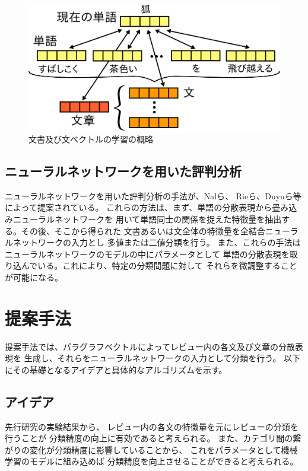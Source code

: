 \documentclass{ttithesis}
\begin{document}
\begin{figure}
  \includegraphics{fig/dvsvwv.png}
  \caption{文書及び文ベクトルの学習の概略}
  \label{fig:ParagraphVector}
\end{figure}


\subsection{ニューラルネットワークを用いた評判分析}

 ニューラルネットワークを用いた評判分析の手法が、Nalら\cite{nal14}、
Rieら\cite{rie14}、Duyuら\cite{duyu15}等によって提案されている。
 これらの方法は、まず、単語の分散表現から畳み込みニューラルネットワークを
用いて単語同士の関係を捉えた特徴量を抽出する。その後、そこから得られた
文書あるいは文全体の特徴量を全結合ニューラルネットワークの入力とし
多値または二値分類を行う。
また、これらの手法はニューラルネットワークのモデルの中にパラメータとして
単語の分散表現を取り込んでいる。これにより、特定の分類問題に対して
それらを微調整することが可能になる。



\section{提案手法}

提案手法では、パラグラフベクトルによってレビュー内の各文及び文章の分散表現を
生成し、それらをニューラルネットワークの入力として分類を行う。
以下にその基礎となるアイデアと具体的なアルゴリズムを示す。


\subsection{アイデア}

先行研究\cite{fujitani15}の実験結果から、
レビュー内の各文の特徴量を元にレビューの分類を行うことが
分類精度の向上に有効であると考えられる。
また、カテゴリ間の繋がりの変化が分類精度に影響していることから、
これをパラメータとして機械学習のモデルに組み込めば
分類精度を向上させることができると考えられる。
\end{document}
